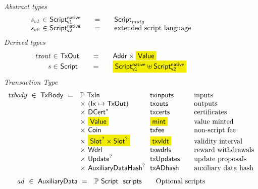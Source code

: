 \begin{figure*}[t!]
  \emph{Abstract types}
  \begin{equation*}
    \begin{array}{r@{~\in~}l@{\qquad=\qquad}lr}
      \var{s_{v1}} & \ScriptNI & \ScriptMSig \\
      \var{s_{v2}} & \Timelock & \text{extended script language}
    \end{array}
  \end{equation*}
  \emph{Derived types}
  \begin{equation*}
    \begin{array}{r@{~\in~}l@{\qquad=\qquad}lr}
      \var{txout} & \TxOut & \Addr \times \hldiff{\Value} \\
      \var{s} & \Script & \hldiff{\ScriptNI \uniondistinct \Timelock}
      \\
    \end{array}
  \end{equation*}
  \emph{Transaction Type}
  \begin{equation*}
    \begin{array}{r@{~~}l@{~~}l@{\qquad}l}
      \var{txbody} ~\in~ \TxBody ~=~
      & \powerset{\TxIn} & \fun{txinputs}& \text{inputs}\\
      &\times ~(\Ix \mapsto \TxOut) & \fun{txouts}& \text{outputs}\\
      & \times~ \seqof{\DCert} & \fun{txcerts}& \text{certificates}\\
       & \times ~\hldiff{\Value}  & \hldiff{\fun{mint}} &\text{value minted}\\
       & \times ~\Coin & \fun{txfee} &\text{non-script fee}\\
       & \times ~\hldiff{\Slot^? \times \Slot^?} & \hldiff{\fun{txvldt}} & \text{validity interval}\\
       & \times~ \Wdrl  & \fun{txwdrls} &\text{reward withdrawals}\\
       & \times ~\Update^?  & \fun{txUpdates} & \text{update proposals}\\
       & \times ~\AuxiliaryDataHash^? & \fun{txADhash} & \text{auxiliary data hash}
    \end{array}
  \end{equation*}
  \begin{equation*}
    \begin{array}{r@{~~}l@{~~}l@{\qquad}l}
      \var{ad} ~\in~ \AuxiliaryData ~=~
      & \powerset{\Script} & \fun{scripts}& \text{Optional scripts}\\

\end{array}
\end{equation*}
\end{figure*}
